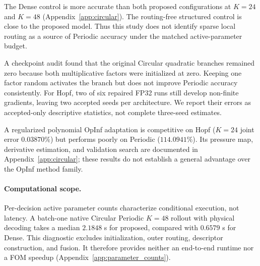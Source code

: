 The Dense control is more accurate than both proposed configurations at
$K=24$ and $K=48$ (Appendix~\ref{app:circular}). The routing-free
structured control is close to the proposed model. Thus this study does
not identify sparse local routing as a source of Periodic accuracy under
the matched active-parameter budget.

A checkpoint audit found that the original Circular quadratic branches
remained zero because both multiplicative factors were initialized at
zero. Keeping one factor random activates the branch but does not improve
Periodic accuracy consistently. For Hopf, two of six repaired FP32 runs
still develop non-finite gradients, leaving two accepted seeds per
architecture. We report their errors as accepted-only descriptive
statistics, not complete three-seed estimates.

A regularized polynomial OpInf adaptation is competitive on Hopf
($K=24$ joint error $0.03870\%$) but performs poorly on Periodic
($114.0941\%$). Its pressure map, derivative estimation, and validation
search are documented in Appendix~\ref{app:circular}; these results do
not establish a general advantage over the OpInf method family.

\paragraph{Computational scope.}
Per-decision active parameter counts characterize conditional execution,
not latency. A batch-one native Circular Periodic $K=48$ rollout with
physical decoding takes a median $2.1848$ s for proposed, compared with
$0.6579$ s for Dense. This diagnostic excludes initialization, outer
routing, descriptor construction, and fusion. It therefore provides
neither an end-to-end runtime nor a FOM speedup
(Appendix~\ref{app:parameter_counts}).
